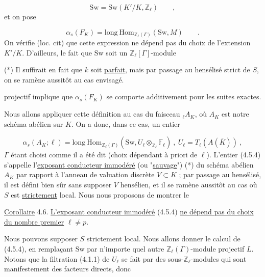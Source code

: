 \begin{equation}\tag{4.5.2}
\mathrm{Sw} = \mathrm{Sw}(K'/K,\mathbb{Z}_\ell) \qquad ,
\end{equation}
et on pose

\begin{equation}\tag{4.5.3}
\alpha_s(F_K) = \mathrm{long}\ \mathrm{Hom}_{\mathbb{Z}_\ell(\Gamma)}(\mathrm{Sw},M) \qquad .
\end{equation}
On vérifie (loc. cit) que cette expression ne dépend pas du choix de l'extension $K'/K$. D'ailleurs, le fait que $\mathrm{Sw}$ soit un $\mathbb{Z}_\ell[\Gamma]$-module

(*) Il suffirait en fait que $k$ soit \underline{parfait}, mais par passage au hensélisé strict de $S$, on se ramène aussitôt au cas envisagé.



projectif implique que $\alpha_s(F_K)$ se comporte additivement pour les suites exactes.

Nous allons appliquer cette définition au cas du faisceau ${}_\ell A_K$, où $A_K$ est notre schéma abélien sur $K$. On a donc, dans ce cas, un entier

\begin{equation}\tag{4.5.4}
\alpha_s(A_K;\ell) = \mathrm{long}\ \mathrm{Hom}_{\mathbb{Z}_\ell(\Gamma)}(\mathrm{Sw},U_\ell \otimes_{\mathbb{Z}_\ell} \mathbb{F}_\ell) \ , \ U_\ell = T_\ell(A(\overline{K})) \ ,
\end{equation}
$\Gamma$ étant choisi comme il a été dit (choix dépendant à priori de $\ell$). L'entier (4.5.4) s'appelle l'\underline{exposant conducteur immodéré} (ou "\underline{sauvage}") (*) du schéma abélien $A_K$ par rapport à l'anneau de valuation discrète $V \subset K$ ; par passage au hensélisé, il est défini bien sûr sans supposer $V$ hensélien, et il se ramène aussitôt au cas où $S$ est \underline{strictement} local. Nous nous proposons de montrer le

\underline{Corollaire} 4.6. \underline{L'exposant conducteur immodéré} (4.5.4) \underline{ne dépend pas du choix du nombre premier} $\ell \neq p$.

Nous pouvons supposer $S$ strictement local. Nous allons donner le calcul de (4.5.4), en remplaçant $\mathrm{Sw}$ par n'importe quel autre $\mathbb{Z}_\ell(\Gamma)$-module projectif $L$. Notons que la filtration (4.1.1) de $U_\ell$ se fait par des sous-$\mathbb{Z}_\ell$-modules qui sont manifestement des facteurs directs, donc

